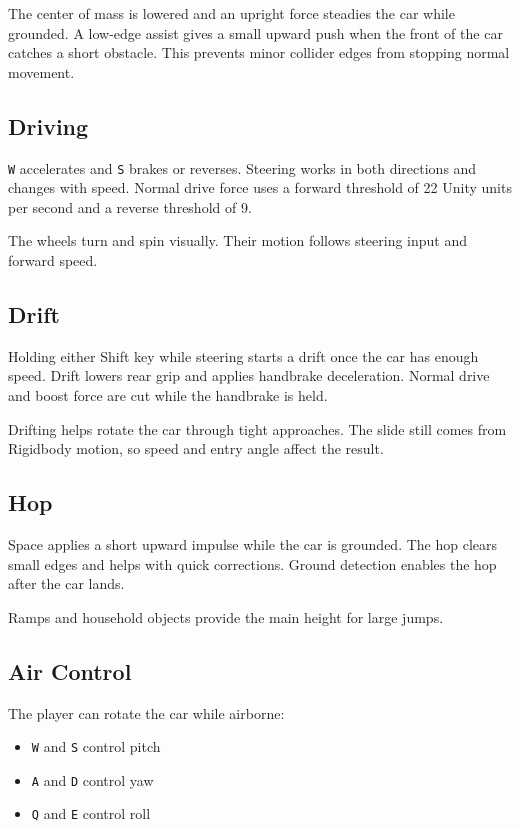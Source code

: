 \documentclass[11pt,a4paper]{article}
\begin{document}
The center of mass is lowered and an upright force steadies the car while grounded. A low-edge assist gives a small upward push when the front of the car catches a short obstacle. This prevents minor collider edges from stopping normal movement.

\subsection{Driving}\label{driving}

\texttt{W} accelerates and \texttt{S} brakes or reverses. Steering works in both directions and changes with speed. Normal drive force uses a forward threshold of 22 Unity units per second and a reverse threshold of 9.

The wheels turn and spin visually. Their motion follows steering input and forward speed.

\subsection{Drift}\label{drift}

Holding either Shift key while steering starts a drift once the car has enough speed. Drift lowers rear grip and applies handbrake deceleration. Normal drive and boost force are cut while the handbrake is held.

Drifting helps rotate the car through tight approaches. The slide still comes from Rigidbody motion, so speed and entry angle affect the result.

\subsection{Hop}\label{hop}

Space applies a short upward impulse while the car is grounded. The hop clears small edges and helps with quick corrections. Ground detection enables the hop after the car lands.

Ramps and household objects provide the main height for large jumps.

\subsection{Air Control}\label{air-control}

The player can rotate the car while airborne:

\begin{itemize}
\item
  \texttt{W} and \texttt{S} control pitch
\item
  \texttt{A} and \texttt{D} control yaw
\item
  \texttt{Q} and \texttt{E} control roll
\end{itemize}
\end{document}

